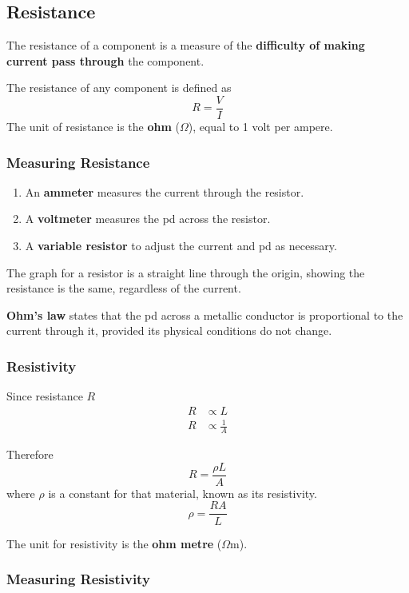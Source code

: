 \subsection{Resistance}

The resistance of a component is a measure of the \textbf{difficulty of making current pass through} the component.

The resistance of any component is defined as
$$R=\frac{V}{I}$$
The unit of resistance is the \textbf{ohm} ($\Omega$), equal to 1 volt per ampere.

\subsubsection*{Measuring Resistance}

\begin{enumerate}
    \item An \textbf{ammeter} measures the current through the resistor.
    \item A \textbf{voltmeter} measures the pd across the resistor.
    \item A \textbf{variable resistor} to adjust the current and pd as necessary.
\end{enumerate}

The graph for a resistor is a straight line through the origin, showing the resistance is the same, regardless of the current.

\textbf{Ohm's law} states that the pd across a metallic conductor is proportional to the current through it, provided its physical conditions do not change.

\subsubsection*{Resistivity}

Since resistance $R$
\begin{align*}
    R&\propto L\\
    R&\propto\frac{1}{A}
\end{align*}

Therefore
$$R=\frac{\rho L}{A}$$
where $\rho$ is a constant for that material, known as its resistivity.
$$\rho=\frac{RA}{L}$$

The unit for resistivity is the \textbf{ohm metre} ($\Omega$m).

\subsubsection*{Measuring Resistivity}

